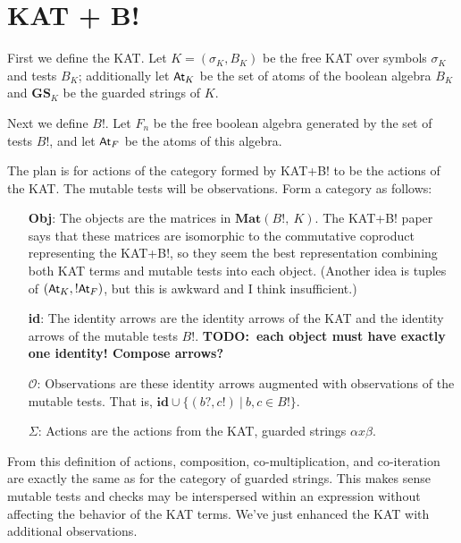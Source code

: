 \documentclass{article}
\newcommand{\atoms}{\textsf{\small{At}}}
\newcommand{\gs}{\textbf{GS}}
\newcommand{\mat}[1]{\textbf{Mat}(#1)}
\newcommand{\todo}[1]{\textbf{TODO:~#1}}
\begin{document}
\section*{KAT + B!}

First we define the KAT.
Let $K = (\sigma_K, B_K)$ be the free KAT over symbols $\sigma_K$ and tests $B_K$; additionally let $\atoms_K$ be the set of atoms of the boolean algebra $B_K$ and $\gs_K$ be the guarded strings of $K$.

Next we define $B!$.
Let $F_n$ be the free boolean algebra generated by the set of tests $B!$, and let $\atoms_F$ be the atoms of this algebra.

The plan is for actions of the category formed by KAT+B! to be the actions of the KAT.
The mutable tests will be observations.
Form a category as follows:
\begin{itemize}
\item [\textbf{Obj}:]
  The objects are the matrices in $\mat{B!,~K}$.
  The KAT+B! paper says that these matrices are isomorphic to the commutative coproduct representing the KAT+B!, so they seem the best representation combining both KAT terms and mutable tests into each object.
  (Another idea is tuples of $(\atoms_K,!\atoms_F)$, but this is awkward and I think insufficient.)
\item [\textbf{id}:]
  The identity arrows are the identity arrows of the KAT and the identity arrows of the mutable tests $B!$.
  \todo{each object must have exactly one identity! Compose arrows?}
\item [$\mathcal{O}$:]
  Observations are these identity arrows augmented with observations of the mutable tests.
  That is, $\textbf{id} \cup \{ (b?,c!)~|~b,c \in B! \}$.
\item [$\Sigma$:]
  Actions are the actions from the KAT, guarded strings $\alpha x \beta$.
\end{itemize}

From this definition of actions, composition, co-multiplication, and co-iteration are exactly the same as for the category of guarded strings.
This makes sense \textemdash mutable tests and checks may be interspersed within an expression without affecting the behavior of the KAT terms.
We've just enhanced the KAT with additional observations.
\end{document}

